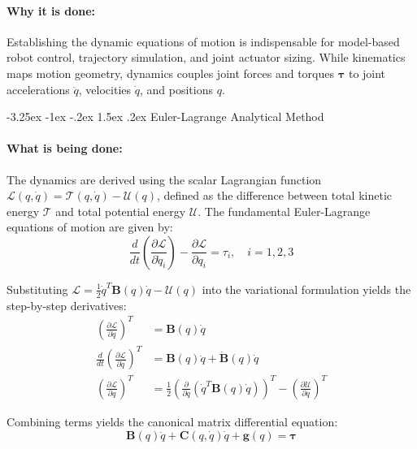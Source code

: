 ﻿\documentclass[11pt, a4paper]{article}
\makeatletter
\renewcommand{\subsection}{\@startsection{subsection}{2}{\z@}%
    {-3.25ex \@plus -1ex \@minus -.2ex}%
    {1.5ex \@plus .2ex}%
    {\normalfont\large\bfseries\color{brandaccent}}}
\makeatother
\begin{document}
\paragraph{Why it is done:}
Establishing the dynamic equations of motion is indispensable for model-based robot control, trajectory simulation, and joint actuator sizing. While kinematics maps motion geometry, dynamics couples joint forces and torques $\boldsymbol{\tau}$ to joint accelerations $\ddot{q}$, velocities $\dot{q}$, and positions $q$.

\subsection{Euler-Lagrange Analytical Method}
\paragraph{What is being done:}
The dynamics are derived using the scalar Lagrangian function \\$\mathcal{L}(q, \dot{q}) = \mathcal{T}(q, \dot{q}) - \mathcal{U}(q)$, defined as the difference between total kinetic energy $\mathcal{T}$ and total potential energy $\mathcal{U}$. The fundamental Euler-Lagrange equations of motion are given by:
\begin{equation}
    \frac{d}{dt}\left(\frac{\partial \mathcal{L}}{\partial \dot{q}_i}\right) - \frac{\partial \mathcal{L}}{\partial q_i} = \tau_i, \quad i = 1, 2, 3
\end{equation}

Substituting $\mathcal{L} = \frac{1}{2}\dot{q}^T \mathbf{B}(q)\dot{q} - \mathcal{U}(q)$ into the variational formulation yields the step-by-step derivatives:
\begin{align}
    \left(\frac{\partial \mathcal{L}}{\partial \dot{q}}\right)^T &= \mathbf{B}(q)\dot{q} \\
    \frac{d}{dt}\left(\frac{\partial \mathcal{L}}{\partial \dot{q}}\right)^T &= \mathbf{B}(q)\ddot{q} + \mathbf{\dot{B}}(q)\dot{q} \\
    \left(\frac{\partial \mathcal{L}}{\partial q}\right)^T &= \frac{1}{2}\left(\frac{\partial}{\partial q}\left(\dot{q}^T \mathbf{B}(q)\dot{q}\right)\right)^T - \left(\frac{\partial \mathcal{U}}{\partial q}\right)^T
\end{align}

Combining terms yields the canonical matrix differential equation:
\begin{equation}
    \mathbf{B}(q)\ddot{q} + \mathbf{C}(q, \dot{q})\dot{q} + \mathbf{g}(q) = \boldsymbol{\tau}
\end{equation}
\end{document}
